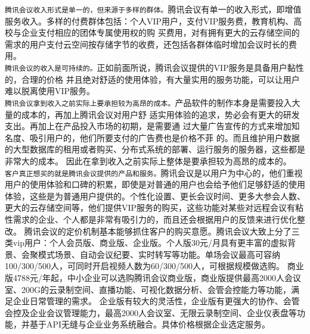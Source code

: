 \documentclass[a4paper,12pt]{article}
\begin{document}
\texttt{腾讯会议收入形式是单一的，但来源于多样的群体。}腾讯会议有单一的收入形式，即增值服务收入。多样的付费群体包括：个人VIP用户，支付VIP服务费，教育机构、高校与企业支付相应的团体专属使用权的购
买费用，对有拥有更大的云存储空间的需求的用户支付云空间按存储字节的收费，还包括各群体临时增加会议时长的费用。\\

\texttt{腾讯会议的收入是可持续的。}正如前面所说，腾讯会议提供的VIP服务是具备用户黏性的，合理的价格
并且绝对舒适的使用体验，有大量实用的服务功能，可以让用户难以脱离使用VIP服务。\\

\texttt{腾讯会议拿到收入之前实际上要承担较为高昂的成本。}产品软件的制作本身是需要投入大量的成本的，再加上腾讯会议对用户舒
适实用体验的追求，势必会有更大的研发支出。再加上在产品投入市场的初期，是需要通
过大量广告宣传的方式来增加知名度、吸引用户的，他们所要支付的广告费也是价格不菲
的。而且维护用户数据的大型数据库的租用或者购买、分布式系统的部署、运行服务的服务器，这些都是非常大的成本。
因此在拿到收入之前实际上整体是要承担较为高昂的成本的。\\

\texttt{客户真正想买的就是腾讯会议提供的产品和服务。}腾讯会议是以用户为中心的，他们重视用户的使用体验和口碑的积累，即使是对普通的用户也会给予他们足够舒适的使用体验，这些是为普通用户提供的。个性化设置、更长会议时间、更多大参会人数、
更大的云存储空间等，他们提供VIP服务的购买，这些功能对某些对远程会议有粘性需求的企业、个人都是非常有吸引力的，而且还会根据用户的反馈来进行优化整改。
腾讯会议的定价机制基本能够抓住客户的购买意愿。腾讯会议大致上分了三类vip用户：个人会员版、商业版、企业版。个人版30元/月具有更丰富的虚拟背景、会聚模式场景、自动会议纪要、实时转写等功能。单场会议最高可容纳100/300/500人，可同时开启视频人数为60/300/500人，可根据规模做选购。
商业版4788元/年起，中小企业可以选购腾讯会议商业版，商业版提供最高2000人会议室、200G的云录制空间、直播功能、可视化数据分析、会管会控能力等功能，满足企业日常管理的需求。
企业版有较大的灵活性，企业版有更强大的协作、会管会控及企业会议管理能力，最高2000人会议室、无限云录制空间、企业仪表盘等功能，并基于API无缝与企业业务系统融合。具体价格根据企业选定服务。\\
\end{document}
